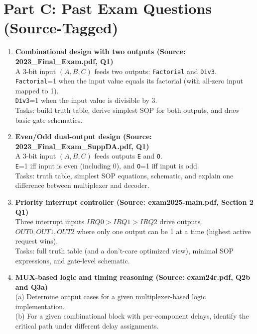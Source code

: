 \documentclass[11pt]{article}
\begin{document}
\section*{Part C: Past Exam Questions (Source-Tagged)}
\begin{enumerate}[label=\textbf{C\arabic*.}]
  \item \textbf{Combinational design with two outputs (Source: 2023\_Final\_Exam.pdf, Q1)}\\
  A 3-bit input $(A,B,C)$ feeds two outputs: \texttt{Factorial} and \texttt{Div3}.\\
  \texttt{Factorial}=1 when the input value equals its factorial (with all-zero input mapped to 1).\\
  \texttt{Div3}=1 when the input value is divisible by 3.\\
  Tasks: build truth table, derive simplest SOP for both outputs, and draw basic-gate schematics.

  \item \textbf{Even/Odd dual-output design (Source: 2023\_Final\_Exam\_SuppDA.pdf, Q1)}\\
  A 3-bit input $(A,B,C)$ feeds outputs \texttt{E} and \texttt{O}.\\
  \texttt{E}=1 iff input is even (including 0), and \texttt{O}=1 iff input is odd.\\
  Tasks: truth table, simplest SOP equations, schematic, and explain one difference between multiplexer and decoder.

  \item \textbf{Priority interrupt controller (Source: exam2025-main.pdf, Section 2 Q1)}\\
  Three interrupt inputs $IRQ0>IRQ1>IRQ2$ drive outputs $OUT0,OUT1,OUT2$ where only one output can be 1 at a time (highest active request wins).\\
  Tasks: full truth table (and a don't-care optimized view), minimal SOP expressions, and gate-level schematic.

  \item \textbf{MUX-based logic and timing reasoning (Source: exam24r.pdf, Q2b and Q3a)}\\
  (a) Determine output cases for a given multiplexer-based logic implementation.\\
  (b) For a given combinational block with per-component delays, identify the critical path under different delay assignments.
\end{enumerate}
\end{document}
